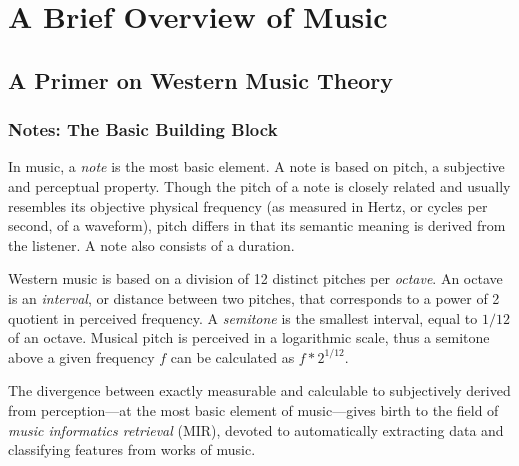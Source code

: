 \chapter{A Brief Overview of Music}

\section{A Primer on Western Music Theory}

\subsection{Notes: The Basic Building Block}

In music, a \textit{note} is the most basic element. A note is based on pitch, a subjective and perceptual property. Though the pitch of a note is closely related and usually resembles its objective physical frequency (as measured in Hertz, or cycles per second, of a waveform), pitch differs in that its semantic meaning is derived from the listener. A note also consists of a duration.

Western music is based on a division of 12 distinct pitches per \textit{octave}. An octave is an \textit{interval}, or distance between two pitches, that corresponds to a power of 2 quotient in perceived frequency. A \textit{semitone} is the smallest interval, equal to $1/12$ of an octave. Musical pitch is perceived in a logarithmic scale, thus a semitone above a given frequency $f$ can be calculated as $f*2^{1/12}$.

The divergence between exactly measurable and calculable to subjectively derived from perception---at the most basic element of music---gives birth to the field of \textit{music informatics retrieval} (MIR), devoted to automatically extracting data and classifying features from works of music.